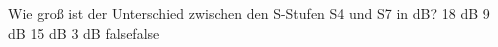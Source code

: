     {Wie groß ist der Unterschied zwischen den S-Stufen S4 und S7 in dB?}
    {18 dB}
    {9 dB}
    {15 dB}
    {3 dB}
    {false}{false}